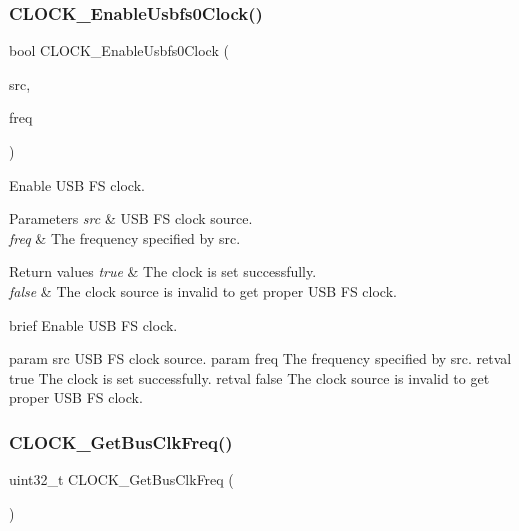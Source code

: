 \subsubsection{\texorpdfstring{CLOCK\_EnableUsbfs0Clock()}{CLOCK\_EnableUsbfs0Clock()}}
{\footnotesize\ttfamily bool C\+L\+O\+C\+K\+\_\+\+Enable\+Usbfs0\+Clock (\begin{DoxyParamCaption}\item[{\mbox{\hyperlink{group__clock_ga014128d824509a661c917ed0ed21149f}{clock\+\_\+usb\+\_\+src\+\_\+t}}}]{src,  }\item[{uint32\+\_\+t}]{freq }\end{DoxyParamCaption})}



Enable U\+SB FS clock. 


\begin{DoxyParams}{Parameters}
{\em src} & U\+SB FS clock source. \\
\hline
{\em freq} & The frequency specified by src. \\
\hline
\end{DoxyParams}

\begin{DoxyRetVals}{Return values}
{\em true} & The clock is set successfully. \\
\hline
{\em false} & The clock source is invalid to get proper U\+SB FS clock.\\
\hline
\end{DoxyRetVals}
brief Enable U\+SB FS clock.

param src U\+SB FS clock source. param freq The frequency specified by src. retval true The clock is set successfully. retval false The clock source is invalid to get proper U\+SB FS clock. \mbox{\label{group__clock_ga9da592c7723873abbfa51a62cbbff03d}} 
\subsubsection{\texorpdfstring{CLOCK\_GetBusClkFreq()}{CLOCK\_GetBusClkFreq()}}
{\footnotesize\ttfamily uint32\+\_\+t C\+L\+O\+C\+K\+\_\+\+Get\+Bus\+Clk\+Freq (\begin{DoxyParamCaption}\item[{void}]{ }\end{DoxyParamCaption})}



